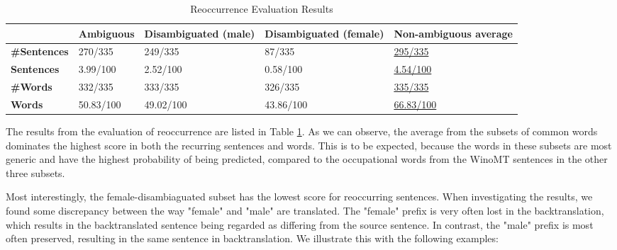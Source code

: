 \begin{table}[!htb]
    \begin{subtable}{\textwidth}
        \centering
        \begin{tabularx}{\linewidth}{|X|XXXX|}
            \hline
             & \textbf{Ambiguous} & \textbf{Disambiguated (male)} & \textbf{Disambiguated (female)} & \textbf{Non-ambiguous average} \\ \hline
             \textbf{\#Sentences} & 270/335 & 249/335 & 87/335 & \underline{295/335} \\ 
             \textbf{Sentences} & 3.99/100 & 2.52/100 & 0.58/100 & \underline{4.54/100} \\ \hline
             \textbf{\#Words} & 332/335 & 333/335 & 326/335 & \underline{335/335} \\
             \textbf{Words} & 50.83/100 & 49.02/100 & 43.86/100 & \underline{66.83/100} \\ \hline
        \end{tabularx}
        \label{tab:reoccurrence_sampling}
    \end{subtable}
    
    \caption{Reoccurrence Evaluation Results}
    \label{tab:reoccurrence}
\end{table}

The results from the evaluation of reoccurrence are listed in Table \ref{tab:reoccurrence}.
As we can observe, the average from the subsets of common words dominates the highest score in both the recurring sentences and words. This is to be expected, because the words in these subsets are most generic and have the highest probability of being predicted, compared to the occupational words from the WinoMT sentences in the other three subsets. 

Most interestingly, the female-disambiaguated subset has the lowest score for reoccurring sentences. When investigating the results, we found some discrepancy between the way "female" and "male" are translated. The "female" prefix is very often lost in the backtranslation, which results in the backtranslated sentence being regarded as differing from the source sentence. In contrast, the "male" prefix is most often preserved, resulting in the same sentence in backtranslation. We illustrate this with the following examples:

